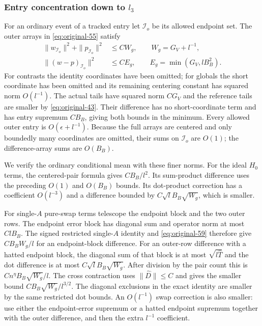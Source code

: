 \subsubsection*{Entry concentration down to $l_3$}
For an ordinary event of a tracked entry let $\mathcal I_o$ be its
allowed endpoint set.  The outer arrays in
\eqref{eq:original-55} satisfy
\begin{equation}
 \begin{split}
 \|w_{\mathcal I_o}\|^2+\|p_{\mathcal I_o}\|^2
      &\le C W_g,\qquad W_g=G_V+l^{-1},\\
 \|(w-p)_{\mathcal I_o}\|^2
      &\le C E_g,\qquad E_g=\min(G_V,lB_B^2).
 \end{split}
 \label{eq:original-59}
\end{equation}
For contrasts the identity coordinates have been omitted; for
globals the short coordinate has been omitted and its remaining
centering constant has squared norm $O(l^{-1})$.
The actual tails have squared norm $CG_V$ and the reference tails
are smaller by \eqref{eq:original-43}.
Their difference has no short-coordinate term and has entry
supremum $CB_B$, giving both bounds in the minimum.
Every allowed outer entry is $O(\epsilon+l^{-1})$.
Because the full arrays are centered and only boundedly many
coordinates are omitted, their sums on $\mathcal I_o$ are $O(1)$;
the difference-array sums are $O(B_B)$.

We verify the ordinary conditional mean with these finer norms.
For the ideal $H_0$ terms, the centered-pair formula gives
$CB_B/l^2$.  Its sum-product difference uses the preceding
$O(1)$ and $O(B_B)$ bounds.  Its dot-product correction has a
coefficient $O(l^{-3})$ and a difference bounded by
$C\sqrt l B_B\sqrt{W_g}$, which is smaller.

For single-$A$ pure-swap terms telescope the endpoint block and
the two outer rows.  The endpoint error block has diagonal sum
and operator norm at most $ClB_B$.  The signed restricted
single-$A$ identity and \eqref{eq:original-59} therefore give
$CB_BW_g/l$ for an endpoint-block difference.
For an outer-row difference with a hatted endpoint block,
the diagonal sum of that block is at most
$\sqrt{l\widehat T}$ and the dot difference is at most
$C\sqrt lB_B\sqrt{W_g}$.
After division by the pair count this is
$Cn^\eta B_B\sqrt{W_g}/l$.
The cross contraction uses $\|\widehat D\|\le C$ and gives
the smaller bound $CB_B\sqrt{W_g}/l^{3/2}$.
The diagonal exclusions in the exact identity are smaller by the
same restricted dot bounds.  An $O(l^{-1})$ swap correction is
also smaller: use either the endpoint-error supremum or a hatted
endpoint supremum together with the outer difference, and then
the extra $l^{-1}$ coefficient.

